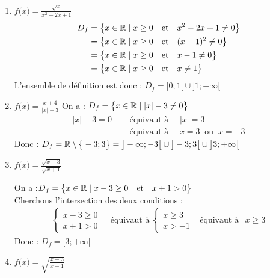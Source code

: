 \documentclass[10pt, a4paper]{article}
\begin{document}
\begin{Solution}[APPLICATION][1]
\begin{enumerate}[leftmargin=*,itemsep=0.5pt]
    \item  $f\big( x \big) = \frac{\sqrt{x}}{x^2 - 2x + 1}$
    \begin{align*}
        D_f &= \big\{ x \in \mathbb{R} \mid  x \geq 0 \quad \text{et} \quad x^2 - 2x + 1 \neq 0  \big\} \\
         &= \big\{ x \in \mathbb{R} \mid  x \geq 0 \quad \text{et} \quad (x-1)^2 \neq 0  \big\} \\
         &= \big\{ x \in \mathbb{R} \mid  x \geq 0 \quad \text{et} \quad x-1 \neq 0  \big\} \\
         &= \big\{ x \in \mathbb{R} \mid  x \geq 0 \quad \text{et} \quad x \neq 1  \big\}
    \end{align*}
    L'ensemble de définition est donc :
    $D_f = \big[ 0 ; 1 \big[ \cup \big] 1 ; +\infty \big[$

    \item $f\big( x \big) = \frac{x+4}{|x| - 3}$
    On a : \quad  $D_f = \big\{ x \in \mathbb{R} \mid |x| - 3 \neq 0 \big\}$ 
    \begin{align*}
        |x| - 3 = 0 & \quad \text{ équivaut à } \quad |x| = 3 \\
        & \quad \text{ équivaut à } \quad x = 3 ~\text{ ou }~ x = -3
    \end{align*}
     Donc : \quad 
     $D_f = \mathbb{R} \setminus \big\{ -3 ; 3 \big\} = \big] -\infty ; -3 \big[ \cup \big] -3 ; 3 \big[ \cup \big] 3 ; +\infty \big[$ 

    \item $f\big( x \big) = \frac{\sqrt{x-3}}{\sqrt{x+1}}$

    On a :$D_f = \big\{ x \in \mathbb{R} \mid  x - 3 \geq 0 \quad \text{et} \quad x + 1  > 0 \big\} $ \\
    Cherchons l'intersection des deux conditions :
    \begin{align*}
        \begin{cases} x - 3 \geq 0 \\ x + 1 > 0 \end{cases} &\text{ équivaut à } \begin{cases} x \geq 3 \\ x > -1 \end{cases} ~~
        \text{ équivaut à } ~~ x \geq 3
    \end{align*}
    Donc : \qquad
     $D_f = \big[ 3 ; +\infty \big[$

    \item  $f\big( x \big) = \sqrt{\frac{x-3}{x+1}}$
    

\end{enumerate}
\end{Solution}
\end{document}
